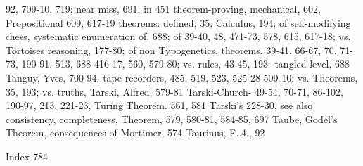 92, 709-10, 719; near miss, 691; in             451 theorem-proving, mechanical, 602,
Propositional                                   609, 617-19 theorems: defined, 35;
Calculus, 194; of self-modifying chess,         systematic enumeration of,
688; of                                         39-40, 48, 471-73, 578, 615, 617-18; vs.
Tortoises       reasoning,      177-80;    of   non
Typogenetics,                                   theorems, 39-41, 66-67, 70, 71-73, 190-91,
513, 688                                        416-17, 560, 579-80; vs. rules, 43-45, 193-
tangled level, 688 Tanguy, Yves, 700            94,
tape recorders, 485, 519, 523, 525-28           509-10; vs. Theorems, 35, 193; vs. truths,
Tarski, Alfred, 579-81 Tarski-Church-           49-54, 70-71, 86-102, 190-97, 213, 221-23,
Turing Theorem. 561, 581 Tarski's               228-30, see also consistency, completeness,
Theorem, 579, 580-81, 584-85, 697 Taube,        Godel's Theorem, consequences of
Mortimer, 574 Taurinus, F..4., 92



Index                                                                                     784

